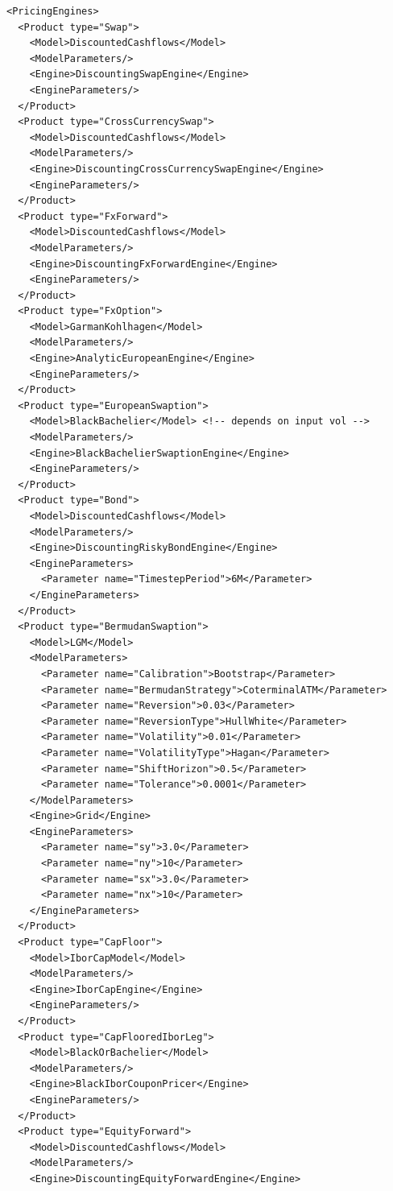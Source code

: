 \documentclass[12pt, a4paper]{article}
\newenvironment{longlisting}{\captionsetup{type=listing}}{}
\begin{document}
\begin{longlisting}
\begin{verbatim}
<PricingEngines>
  <Product type="Swap">
    <Model>DiscountedCashflows</Model>
    <ModelParameters/>
    <Engine>DiscountingSwapEngine</Engine>
    <EngineParameters/>
  </Product>
  <Product type="CrossCurrencySwap">
    <Model>DiscountedCashflows</Model>
    <ModelParameters/>
    <Engine>DiscountingCrossCurrencySwapEngine</Engine>
    <EngineParameters/>
  </Product>
  <Product type="FxForward">
    <Model>DiscountedCashflows</Model>
    <ModelParameters/>
    <Engine>DiscountingFxForwardEngine</Engine>
    <EngineParameters/>
  </Product>
  <Product type="FxOption">
    <Model>GarmanKohlhagen</Model>
    <ModelParameters/>
    <Engine>AnalyticEuropeanEngine</Engine>
    <EngineParameters/>
  </Product>
  <Product type="EuropeanSwaption">
    <Model>BlackBachelier</Model> <!-- depends on input vol -->
    <ModelParameters/>
    <Engine>BlackBachelierSwaptionEngine</Engine>
    <EngineParameters/>
  </Product>
  <Product type="Bond">
    <Model>DiscountedCashflows</Model>
    <ModelParameters/>
    <Engine>DiscountingRiskyBondEngine</Engine>
    <EngineParameters>
      <Parameter name="TimestepPeriod">6M</Parameter>
    </EngineParameters>
  </Product>
  <Product type="BermudanSwaption">
    <Model>LGM</Model>
    <ModelParameters>
      <Parameter name="Calibration">Bootstrap</Parameter>
      <Parameter name="BermudanStrategy">CoterminalATM</Parameter>
      <Parameter name="Reversion">0.03</Parameter>
      <Parameter name="ReversionType">HullWhite</Parameter>
      <Parameter name="Volatility">0.01</Parameter>
      <Parameter name="VolatilityType">Hagan</Parameter>
      <Parameter name="ShiftHorizon">0.5</Parameter>
      <Parameter name="Tolerance">0.0001</Parameter>
    </ModelParameters>
    <Engine>Grid</Engine>
    <EngineParameters>
      <Parameter name="sy">3.0</Parameter>
      <Parameter name="ny">10</Parameter>
      <Parameter name="sx">3.0</Parameter>
      <Parameter name="nx">10</Parameter>
    </EngineParameters>
  </Product>
  <Product type="CapFloor">
    <Model>IborCapModel</Model>
    <ModelParameters/>
    <Engine>IborCapEngine</Engine>
    <EngineParameters/>
  </Product>
  <Product type="CapFlooredIborLeg">
    <Model>BlackOrBachelier</Model>
    <ModelParameters/>
    <Engine>BlackIborCouponPricer</Engine>
    <EngineParameters/>
  </Product>
  <Product type="EquityForward">
    <Model>DiscountedCashflows</Model>
    <ModelParameters/>
    <Engine>DiscountingEquityForwardEngine</Engine>

\end{verbatim}
\end{longlisting}
\end{document}
